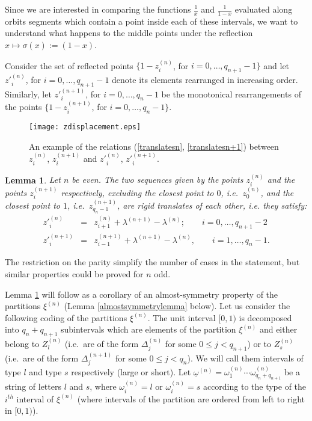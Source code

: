 \documentclass{conm-p-l}
\numberwithin{equation}{section}
\newtheorem{lemma}[theorem]{Lemma}
\begin{document}
Since we are interested in comparing the functions $\frac{1}{x}$ and
$\frac{1}{1-x}$ evaluated along orbits segments which contain a point inside
each of these intervals, we want to understand what happens to the middle points
under the reflection $x\mapsto \sigma(x):=(1-x)$.

Consider the set of reflected  points  $\{ 1- z^{(n)}_i$, for $i=0,\dots,
q_{n+1}-1\}$ and  let  $z'^{(n)}_i$, for $i=0,\dots, q_{n+1}-1$ denote its
elements rearranged in increasing order. Similarly, let  $z'^{(n+1)}_i$, for
$i=0,\dots, q_{n}-1$  be the monotonical rearrangements of the points  $\{ 1-
z^{(n+1)}_i$, for $i=0,\dots, q_{n}-1\}$.

\begin{figure}
\centering
\texttt{[image: zdisplacement.eps]}
\caption{An example of the relations (\ref{translatesn}, \ref{translatesn+1}) between  $z^{(n)}_i $, $z^{(n+1)}_i $ and $z'^{(n)}_i $, $z'^{(n+1)}_i $.
\label{zdisplacement}}
\end{figure} 
\begin{lemma}\label{translatesz} Let $n$ be even.
The two sequences given by the points $z^{(n)}_i $ and the points $z^{(n+1)}_i $
respectively, excluding the closest point to $0$, i.e.~$z^{(n)}_0$, and the
closest point to $1$, i.e.~$z^{(n+1)}_{q_n-1}$, are rigid translates of each
other, i.e. they satisfy:
\begin{eqnarray}
z'^{(n)}_i  &=& z^{(n)}_{i+1} + \lambda^{(n+1)} -  \lambda^{(n)}; \qquad i=0,
\dots, q_{n+1}-2 \label{translatesn}\\ z'^{(n+1)}_i  &=& z^{(n+1)}_{i-1}  +
\lambda^{(n+1)} - \lambda^{(n)} , \qquad  i=1, \dots, q_{n}-
1.\label{translatesn+1}
\end{eqnarray}
\end{lemma}
The restriction on the parity simplify the number of cases in the statement, but
similar properties could be proved for $n$ odd.

Lemma \ref{translatesz} will follow as a corollary of an almost-symmetry
property of the partitions $\xi^{(n)}$ (Lemma \ref{almostsymmetrylemma} below).
Let us consider the following coding of the partitions $\xi^{(n)}$. The unit
interval $[0,1)$ is decomposed into $q_n+q_{n+1}$ subintervals which are elements of
the partition $\xi^{(n)}$ and either belong to $Z^{(n)}_l$ (i.e.~are of the form
$\Delta^{(n)}_j$ for some $0\leq j < q_{n+1}$) or to $Z^{(n)}_s$ (i.e.~are of
the form $\Delta^{(n+1)}_j$ for some $0\leq j < q_{n}$). We will call them
intervals of type $l$ and type $s$ respectively (large or short). Let
$\underline{\omega}^{(n)}= \omega^{(n)}_1 \cdots \omega^{(n)}_{q_n+q_{n+1}}$ be a
string of letters $l$ and $s$, where $\omega^{(n)}_i=l $ or $\omega^{(n)}_i=s $
according to the type of the $i^{th}$ interval of $\xi^{(n)}$  (where intervals of the partition are ordered from left to right in $[0,1)$). 
 
\end{document}
